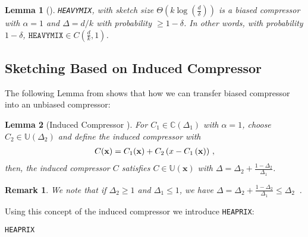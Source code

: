 \documentclass{article}
\newtheorem{lemma}{Lemma}
\newtheorem{remark}{Remark}
\begin{document}
\begin{lemma}[\cite{ivkin2019communication}]
\texttt{HEAVYMIX}, with sketch size $\Theta\left(k\log\left(\frac{d}{\delta}\right)\right)$ is a biased compressor with $\alpha=1$ and  $\Delta=d/k$ with probability $\geq1-\delta$. In other words, with probability $1-\delta$, $\texttt{HEAVYMIX}\in C(\frac{d}{k},1)$. 
\end{lemma}
\subsection{Sketching Based on Induced Compressor}
The following Lemma from \cite{horvath2020better} shows that how we can transfer biased compressor into an unbiased compressor: 
\begin{lemma}[Induced Compressor  \cite{horvath2020better}]\label{lemm:induced_compress}
For $C_1\in \mathbb{C}(\Delta_1)$ with $\alpha=1$, choose $C_2\in \mathbb{U}(\Delta_2)$ and define the induced compressor with
\begin{align}\notag
    C(\mathbf{x})=C_1(\mathbf{x})+C_2\left(x-C_1\left(\mathbf{x}\right)\right)\, ,
\end{align}
then, the induced compressor $C$ satisfies $C\in\mathbb{U}(\mathbf{x})$ with $\Delta=\Delta_2+\frac{1-\Delta_2}{\Delta_1}$.
\end{lemma}
\begin{remark}
We note that if $\Delta_2\geq 1$ and $\Delta_1\leq 1$, we have $\Delta=\Delta_2+\frac{1-\Delta_2}{\Delta_1}\leq \Delta_2$\, .
\end{remark}
Using this concept of the induced compressor we introduce \texttt{HEAPRIX}:
\begin{algorithm}[H]
\caption{\texttt{HEAPRIX} }\label{alg:heaprix}
\begin{algorithmic}[1]
\end{algorithmic}
\end{algorithm}
\end{document}
